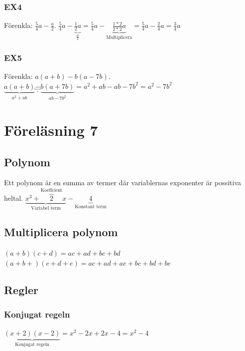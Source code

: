 \documentclass[a4paper,10pt]{article}
\begin{document}
\begin{flushleft}
    \subsubsection{EX4}
      Förenkla: $\frac{5}{4}a-\frac{a}{2}$.\newline\newline
      $ \frac{5}{4}a-\underbrace{\frac{1}{2}a}_{\text{$\frac{a}{2}$}} = \frac{5}{4}a-\underbrace{\frac{1*2}{2*2}a}_{\text{Multiplicera}} = \frac{5}{4}a-\frac{2}{4}a = \frac{3}{4}a $\newline\newline

    \subsubsection{EX5}
      Förenkla: $a(a+b)-b(a-7b)$.\newline\newline
      $\underbrace{a(a+b)}_{\text{$a^2+ab$}} \underbrace{-}_{\text{-}} \underbrace{b(a+7b)}_{\text{$ab-7b^2$}} = a^2+ab-ab-7b^2 = a^2-7b^2 $\newline\newline

\section{Föreläsning 7}
  \subsection{Polynom}
    Ett polynom är en summa av termer där variablernas exponenter är possitiva heltal.\newline
    $ \underbrace{x^3+\overbrace{2}^{\text{Koeffcient}}x}_{\text{Variabel term}} - \underbrace{4}_{\text{Konstant term}} $
  \subsection{Multiplicera polynom}
    $ (a+b)(c+d) = ac+ad+bc+bd $\newline
    $ (a+b+)(c+d+e) = ac+ad+ae+bc+bd+be $\newline
  \subsection{Regler}
    \subsubsection{Konjugat regeln}
      $ \underbrace{(x+2)(x-2) }_{\text{Konjugat regeln}} = x^2-2x+2x-4 = x^2-4 $

\end{flushleft}
\end{document}
